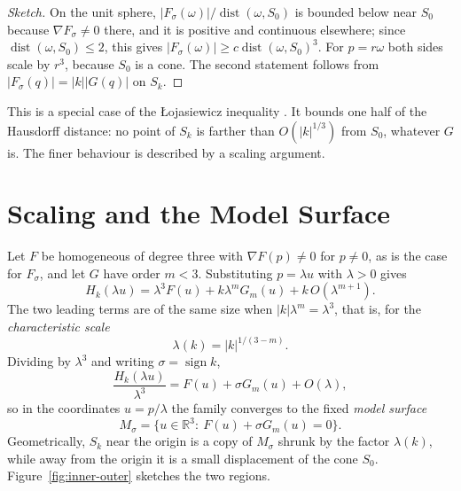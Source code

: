 \documentclass[12pt, a4paper, oneside]{book}
\theoremstyle{plain}
\theoremstyle{definition}
\theoremstyle{remark}
\begin{document}
\begin{proof}[Sketch]
On the unit sphere, $|F_\sigma(\omega)|/\operatorname{dist}(\omega,S_0)$ is
bounded below near $S_0$ because $\nabla F_\sigma\neq0$ there, and it is
positive and continuous elsewhere; since $\operatorname{dist}(\omega,S_0)\le2$,
this gives $|F_\sigma(\omega)|\ge c\operatorname{dist}(\omega,S_0)^3$. For
$p=r\omega$ both sides scale by $r^3$, because $S_0$ is a cone. The second
statement follows from $|F_\sigma(q)|=|k||G(q)|$ on $S_k$.
\end{proof}

This is a special case of the Łojasiewicz inequality
\cite{lojasiewicz1959division}. It bounds one half of the Hausdorff distance:
no point of $S_k$ is farther than $O(|k|^{1/3})$ from $S_0$, whatever $G$ is.
The finer behaviour is described by a scaling argument.

\section{Scaling and the Model Surface}
\label{sec:scaling-law}

Let $F$ be homogeneous of degree three with $\nabla F(p)\neq0$ for $p\neq0$, as
is the case for $F_\sigma$, and let $G$ have order $m<3$. Substituting
$p=\lambda u$ with $\lambda>0$ gives
\[
H_k(\lambda u)=\lambda^3F(u)+k\lambda^mG_m(u)+k\,O(\lambda^{m+1}).
\]
The two leading terms are of the same size when $|k|\lambda^m=\lambda^3$, that is,
for the \emph{characteristic scale}
\begin{equation}
\label{eq:scaling-law}
\lambda(k)=|k|^{1/(3-m)} .
\end{equation}
Dividing by $\lambda^3$ and writing $\sigma=\operatorname{sign}k$,
\begin{equation}
\label{eq:rescaled}
\frac{H_k(\lambda u)}{\lambda^3}=F(u)+\sigma G_m(u)+O(\lambda),
\end{equation}
so in the coordinates $u=p/\lambda$ the family converges to the fixed
\emph{model surface}
\begin{equation}
\label{eq:model-surface}
M_\sigma=\{u\in\mathbb{R}^3:\ F(u)+\sigma G_m(u)=0\}.
\end{equation}
Geometrically, $S_k$ near the origin is a copy of $M_\sigma$ shrunk by the factor
$\lambda(k)$, while away from the origin it is a small displacement of the cone
$S_0$. Figure~\ref{fig:inner-outer} sketches the two regions.
\end{document}
